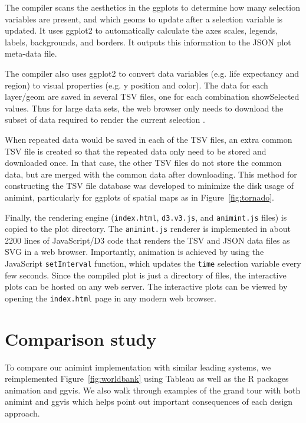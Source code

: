 \documentclass[journal]{vgtc}\usepackage[]{graphicx}\usepackage[]{color}
\begin{document}
The compiler scans the aesthetics in the ggplots to determine
how many selection variables are present, and which geoms to update
after a selection variable is updated. It uses ggplot2 to
automatically calculate the axes scales, legends, labels, backgrounds,
and borders. It outputs this information to the JSON plot meta-data
file.

The compiler also uses ggplot2 to convert data variables (e.g. life
expectancy and region) to visual properties (e.g. y position and
color). The data for each layer/geom are saved in several TSV files,
one for each combination showSelected values. Thus for large data
sets, the web browser only needs to download the subset of data
required to render the current selection \citep{2013-immens}.

When repeated data would be saved in each of the TSV files, an extra
common TSV file is created so that the repeated data only need to be
stored and downloaded once. In that case, the other TSV files do not
store the common data, but are merged with the common data after
downloading. This method for constructing the TSV file database was
developed to minimize the disk usage of animint, particularly
for ggplots of spatial maps as in Figure~\ref{fig:tornado}.

Finally, the rendering engine (\texttt{index.html}, \texttt{d3.v3.js},
and \texttt{animint.js} files) is copied to the plot directory. The
\texttt{animint.js} renderer is implemented in about 2200 lines of
JavaScript/D3 code that renders the TSV and JSON data files as SVG in
a web browser. Importantly, animation is achieved by using the
JavaScript \texttt{setInterval} function, which updates the
\texttt{time} selection variable every few seconds. Since the compiled
plot is just a directory of files, the interactive plots can be hosted
on any web server. The interactive plots can be viewed by opening the
\texttt{index.html} page in any modern web browser.

\section{Comparison study}
\label{sec:compare}

To compare our animint implementation with similar leading systems, we 
reimplemented Figure~\ref{fig:worldbank} using Tableau as well as
the R packages animation and ggvis. We also walk through examples of
the grand tour with both animint and ggvis which helps point out 
important consequences of each design approach.
\end{document}
